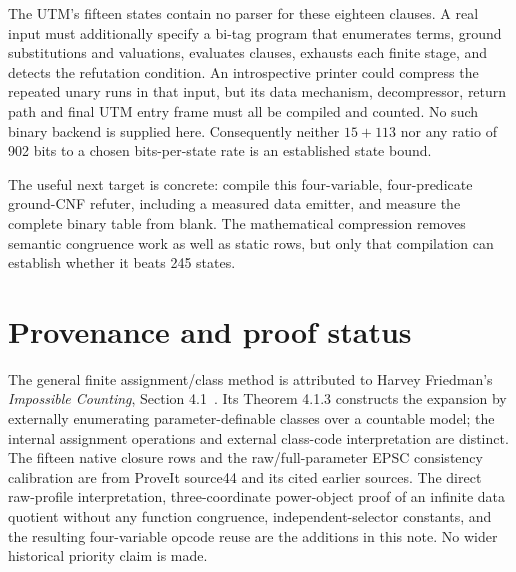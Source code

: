 The UTM's fifteen states contain no parser for these eighteen clauses.
A real input must additionally specify a bi-tag program that enumerates
terms, ground substitutions and valuations, evaluates clauses, exhausts
each finite stage, and detects the refutation condition. An introspective
printer could compress the repeated unary runs in that input, but its
data mechanism, decompressor, return path and final UTM entry frame must
all be compiled and counted. No such binary backend is supplied here.
Consequently neither $15+113$ nor any ratio of 902 bits to a chosen
bits-per-state rate is an established state bound.

The useful next target is concrete: compile this four-variable,
four-predicate ground-CNF refuter, including a measured data emitter,
and measure the complete binary table from blank. The mathematical
compression removes semantic congruence work as well as static rows,
but only that compilation can establish whether it beats 245 states.

\section{Provenance and proof status}

The general finite assignment/class method is attributed to Harvey
Friedman's \emph{Impossible Counting}, Section 4.1~\cite{friedman2017}.
Its Theorem 4.1.3 constructs the expansion by externally enumerating
parameter-definable classes over a countable model; the internal
assignment operations and external class-code interpretation are distinct.
The fifteen native
closure rows and the raw/full-parameter EPSC consistency calibration are
from ProveIt source44 and its cited earlier sources. The direct
raw-profile interpretation, three-coordinate power-object proof of an
infinite data quotient without any function congruence,
independent-selector constants, and the resulting four-variable
opcode reuse are the additions in this note. No wider historical priority
claim is made.

